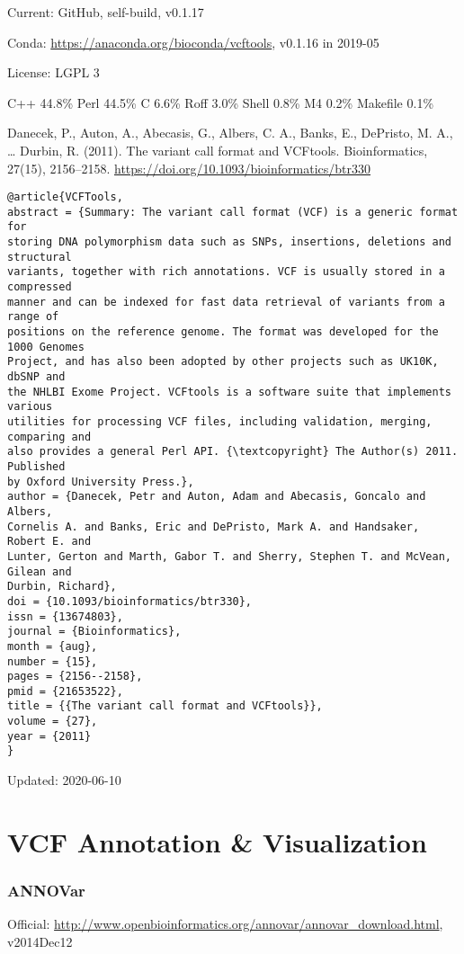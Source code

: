 \documentclass[]{article}
\begin{document}
Current: GitHub, self-build, v0.1.17

Conda: \url{https://anaconda.org/bioconda/vcftools}, v0.1.16 in 2019-05

License: LGPL 3

C++ 44.8\% Perl 44.5\% C 6.6\% Roff 3.0\% Shell 0.8\% M4 0.2\% Makefile 0.1\%

Danecek, P., Auton, A., Abecasis, G., Albers, C. A., Banks, E., DePristo, M. A., … Durbin, R. (2011). The variant call format and VCFtools. Bioinformatics, 27(15), 2156–2158. \url{https://doi.org/10.1093/bioinformatics/btr330}

\begin{verbatim}
@article{VCFTools,
abstract = {Summary: The variant call format (VCF) is a generic format for
storing DNA polymorphism data such as SNPs, insertions, deletions and structural
variants, together with rich annotations. VCF is usually stored in a compressed
manner and can be indexed for fast data retrieval of variants from a range of
positions on the reference genome. The format was developed for the 1000 Genomes
Project, and has also been adopted by other projects such as UK10K, dbSNP and
the NHLBI Exome Project. VCFtools is a software suite that implements various
utilities for processing VCF files, including validation, merging, comparing and
also provides a general Perl API. {\textcopyright} The Author(s) 2011. Published
by Oxford University Press.},
author = {Danecek, Petr and Auton, Adam and Abecasis, Goncalo and Albers,
Cornelis A. and Banks, Eric and DePristo, Mark A. and Handsaker, Robert E. and
Lunter, Gerton and Marth, Gabor T. and Sherry, Stephen T. and McVean, Gilean and
Durbin, Richard},
doi = {10.1093/bioinformatics/btr330},
issn = {13674803},
journal = {Bioinformatics},
month = {aug},
number = {15},
pages = {2156--2158},
pmid = {21653522},
title = {{The variant call format and VCFtools}},
volume = {27},
year = {2011}
}
\end{verbatim}

Updated: 2020-06-10

\part{VCF Annotation \& Visualization}
\section{ANNOVar}

Official: \url{http://www.openbioinformatics.org/annovar/annovar_download.html}, v2014Dec12
\end{document}
